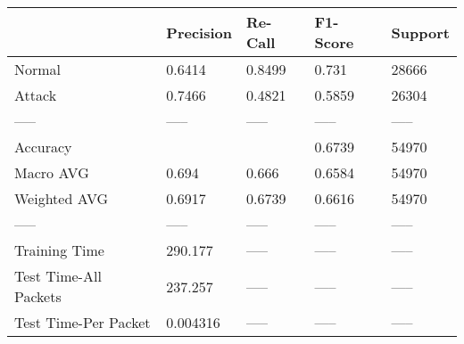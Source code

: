 \begin{tabular}{lllll}
\toprule
{} & Precision & Re-Call & F1-Score & Support \\
\midrule
Normal                &    0.6414 &  0.8499 &    0.731 &   28666 \\
Attack                &    0.7466 &  0.4821 &   0.5859 &   26304 \\
-----                 &     ----- &   ----- &    ----- &   ----- \\
Accuracy              &           &         &   0.6739 &   54970 \\
Macro AVG             &     0.694 &   0.666 &   0.6584 &   54970 \\
Weighted AVG          &    0.6917 &  0.6739 &   0.6616 &   54970 \\
-----                 &     ----- &   ----- &    ----- &   ----- \\
Training Time         &   290.177 &   ----- &    ----- &   ----- \\
Test Time-All Packets &   237.257 &   ----- &    ----- &   ----- \\
Test Time-Per Packet  &  0.004316 &   ----- &    ----- &   ----- \\
\bottomrule
\end{tabular}
